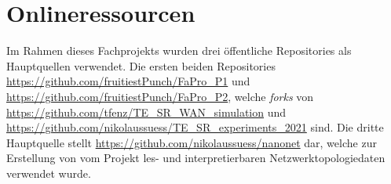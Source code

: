 \documentclass[sigconf, nonacm, review]{acmart}
\begin{document}
\section{Onlineressourcen}
\label{sec:resouces}
Im Rahmen dieses Fachprojekts wurden drei \"offentliche Repositories als Hauptquellen verwendet. Die ersten beiden Repositories \url{https://github.com/fruitiestPunch/FaPro_P1} und \url{https://github.com/fruitiestPunch/FaPro_P2}, welche \emph{forks} von \url{https://github.com/tfenz/TE_SR_WAN_simulation} und \url{https://github.com/nikolaussuess/TE_SR_experiments_2021} sind. Die dritte Hauptquelle stellt \url{https://github.com/nikolaussuess/nanonet} dar, welche zur Erstellung von vom Projekt les- und interpretierbaren Netzwerktopologiedaten verwendet wurde.
\end{document}
